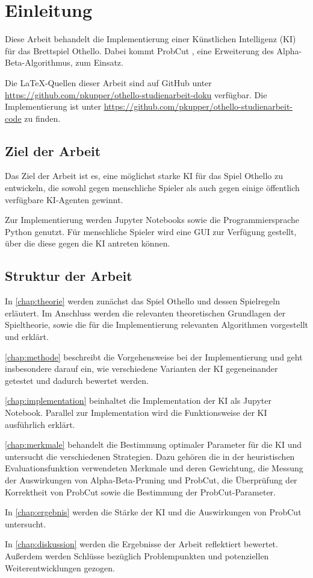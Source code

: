 
\chapter{Einleitung}
\label{chap:einleitung}

Diese Arbeit behandelt die Implementierung einer Künstlichen Intelligenz (\acs{KI}) für das Brettspiel Othello. Dabei kommt ProbCut
\cite[S.~1]{probcut}, eine Erweiterung des Alpha-Beta-Algorithmus, zum Einsatz.

Die \LaTeX-Quellen dieser Arbeit sind auf GitHub unter \url{https://github.com/pkupper/othello-studienarbeit-doku}
verfügbar. Die Implementierung ist unter \url{https://github.com/pkupper/othello-studienarbeit-code} zu finden.

\section{Ziel der Arbeit}
\label{sec:goal}

Das Ziel der Arbeit ist es, eine möglichst starke \ac{KI} für das Spiel Othello zu entwickeln, die sowohl
gegen menschliche Spieler als auch gegen einige öffentlich verfügbare \ac{KI}-Agenten gewinnt.

Zur Implementierung werden Jupyter Notebooks sowie die Programmiersprache Python genutzt.
Für menschliche Spieler wird eine \ac{GUI} zur Verfügung gestellt, über
die diese gegen die \ac{KI} antreten können.

\section{Struktur der Arbeit}
In \autoref{chap:theorie} werden zunächst das Spiel Othello und dessen Spielregeln erläutert. Im Anschluss werden die
relevanten theoretischen Grundlagen der Spieltheorie, sowie die für die Implementierung relevanten Algorithmen
vorgestellt und erklärt.

\autoref{chap:methode} beschreibt die Vorgehensweise bei der Implementierung und geht insbesondere darauf ein, wie
verschiedene Varianten der \ac{KI} gegeneinander getestet und dadurch bewertet werden.

\autoref{chap:implementation} beinhaltet die Implementation der \ac{KI} als Jupyter Notebook. Parallel
zur Implementation wird die Funktionsweise der \ac{KI} ausführlich erklärt.

\autoref{chap:merkmale} behandelt die Bestimmung optimaler Parameter für die \ac{KI} und untersucht die
verschiedenen Strategien. Dazu gehören die in der heuristischen Evaluationsfunktion verwendeten Merkmale und deren
Gewichtung, die Messung der Auswirkungen von Alpha-Beta-Pruning und ProbCut, die Überprüfung der Korrektheit von
ProbCut sowie die Bestimmung der ProbCut-Parameter.

In \autoref{chap:ergebnis} werden die Stärke der \ac{KI} und die Auswirkungen von ProbCut untersucht.

In \autoref{chap:diskussion} werden die Ergebnisse der Arbeit reflektiert bewertet. Außerdem werden Schlüsse bezüglich
Problempunkten und potenziellen Weiterentwicklungen gezogen.
